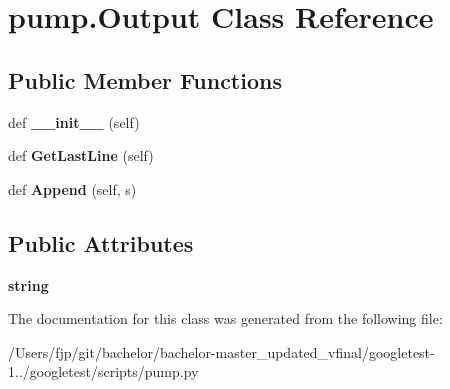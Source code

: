 \hypertarget{classpump_1_1_output}{}\section{pump.\+Output Class Reference}
\label{classpump_1_1_output}
\subsection*{Public Member Functions}
\begin{DoxyCompactItemize}
\item 
\mbox{\label{classpump_1_1_output_a01a703055e40078561bd4a5011de4a6d}} 
def {\bfseries \+\_\+\+\_\+init\+\_\+\+\_\+} (self)
\item 
\mbox{\label{classpump_1_1_output_a6ece94d24be171bae2a2234c052b4c58}} 
def {\bfseries Get\+Last\+Line} (self)
\item 
\mbox{\label{classpump_1_1_output_a6f284bb3f80e03594bc28286c695f5a7}} 
def {\bfseries Append} (self, s)
\end{DoxyCompactItemize}
\subsection*{Public Attributes}
\begin{DoxyCompactItemize}
\item 
\mbox{\label{classpump_1_1_output_a8786848ab3d235189379c449a446f883}} 
{\bfseries string}
\end{DoxyCompactItemize}


The documentation for this class was generated from the following file\+:\begin{DoxyCompactItemize}
\item 
/\+Users/fjp/git/bachelor/bachelor-\/master\+\_\+updated\+\_\+vfinal/googletest-\/1../googletest/scripts/pump.\+py\end{DoxyCompactItemize}
